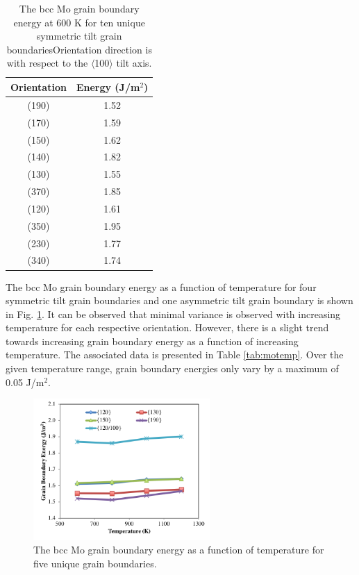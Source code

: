 \documentclass[review]{elsarticle}
\providecommand{\DIFaddtex}[1]{{\protect\color{blue}\uwave{#1}}} %
\providecommand{\DIFaddFL}[1]{\DIFadd{#1}} %
\providecommand{\DIFaddbeginFL}{} %
\providecommand{\DIFaddendFL}{} %
\providecommand{\DIFadd}[1]{\texorpdfstring{\DIFaddtex{#1}}{#1}} %
\newcommand{\DIFaddincludegraphics}[2][]{{\color{blue}\fbox{\DIFOincludegraphics[#1]{#2}}}} %
\DeclareRobustCommand{\DIFaddbeginFL}{\DIFOaddbeginFL \let\includegraphics\DIFaddincludegraphics} %
\DeclareRobustCommand{\DIFaddendFL}{\DIFOaddendFL \let\includegraphics\DIFOincludegraphics} %
\begin{document}
\begin{table}[h]
\caption{The bcc Mo grain boundary energy at 600 K for ten unique symmetric tilt grain boundaries\DIFaddbeginFL \DIFaddFL{. }\DIFaddendFL Orientation direction is with respect to the $\langle$100$\rangle$ tilt axis.} \label{tab:mo600}
\begin{center}
\begin{tabular}{|c|c|}
	\hline
	Orientation & Energy (J/m$^{2}$) \\
	 \hline
	 (190) & 1.52 \\
	 (170) & 1.59 \\
	 (150) & 1.62 \\
	 (140) & 1.82 \\
	 (130) & 1.55 \\	 
	 (370) & 1.85 \\
	 (120) & 1.61 \\
	 (350) & 1.95 \\
	 (230) & 1.77 \\
	 (340) & 1.74 \\
	 \hline
\end{tabular}
\end{center}
\label{default}
\end{table}

\FloatBarrier

The bcc Mo grain boundary energy as a function of temperature for four symmetric tilt grain boundaries and one asymmetric tilt grain boundary is shown in Fig. \ref{fig:motemp}. It can be observed that minimal variance is observed with increasing temperature for each respective orientation. However, there is a slight trend towards increasing grain boundary energy as a function of increasing temperature. The associated data is presented in Table \ref{tab:motemp}. Over the given temperature range, grain boundary energies only vary by a maximum of 0.05 J/m$^{2}$.

\begin{figure}[h]
 \centering
 \includegraphics[width=0.6\textwidth]{mo_temp.png}
 \caption{The bcc Mo grain boundary energy as a function of temperature for five unique grain boundaries.}
 \label{fig:motemp}
\end{figure}
\end{document}
